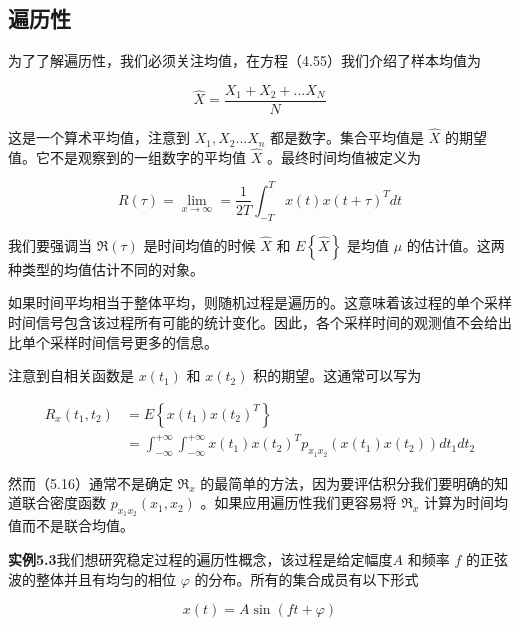 	       \subsection { 遍历性} 
	       
	       为了了解遍历性，我们必须关注均值，在方程（4.55）我们介绍了样本均值为
	       
	        \[  \hat{X}=\frac{X_{1}+X_{2}+...X_{N}}{N}\]
	       
	       这是一个算术平均值，注意到  $ X_{1},X_{2}...X_{n} $  都是数字。集合平均值是 $\hat{X}$  的期望值。它不是观察到的一组数字的平均值 $\hat{X}$ 。最终时间均值被定义为 
	       
	       \begin{equation}\label{5.15}
	       R(\tau) =\lim_{x\longrightarrow\infty}=\frac{1}{2T}\int_{-T}^{T}x(t)x(t+\tau)^{T}dt 
	       \end{equation}
	         
	      我们要强调当  $\Re(\tau) $ 是时间均值的时候 $\hat{X}$ 和 $E\left\lbrace \hat{X}\right\rbrace $ 是均值 $\mu$ 的估计值。这两种类型的均值估计不同的对象。   
	      
	      如果时间平均相当于整体平均，则随机过程是遍历的。这意味着该过程的单个采样时间信号包含该过程所有可能的统计变化。因此，各个采样时间的观测值不会给出比单个采样时间信号更多的信息。
	        
	      注意到自相关函数是 $x(t_{1})$ 和 $x(t_{2})$ 积的期望。这通常可以写为
	      
	    \begin{equation}\label{5.16}
	    \begin{aligned}
	    R_{x}(t_{1},t_{2})&=E\left\lbrace x(t_{1})x(t_{2})^{T}\right\rbrace\\
	    &=\int_{-\infty}^{+\infty}\int_{-\infty}^{+\infty} x(t_{1})x(t_{2})^{T}p_{x_{1}x_{2}}(x(t_{1})x(t_{2}))dt_{1}dt_{2}
	    \end{aligned}
	    \end{equation}
	      
	      然而（5.16）通常不是确定 $\Re_{x}$ 的最简单的方法，因为要评估积分我们要明确的知道联合密度函数 $p_{x_{1}x_{2}}(x_{1},x_{2})$ 。如果应用遍历性我们更容易将 $\Re_{x}$ 计算为时间均值而不是联合均值。
	      
	      \textbf{实例5.3}我们想研究稳定过程的遍历性概念，该过程是给定幅度$  A $ 和频率 $ f $ 的正弦波的整体并且有均匀的相位  $\varphi$ 的分布。所有的集合成员有以下形式
	      
	       \[ x(t)=A\sin(ft+\varphi) \]
	       
